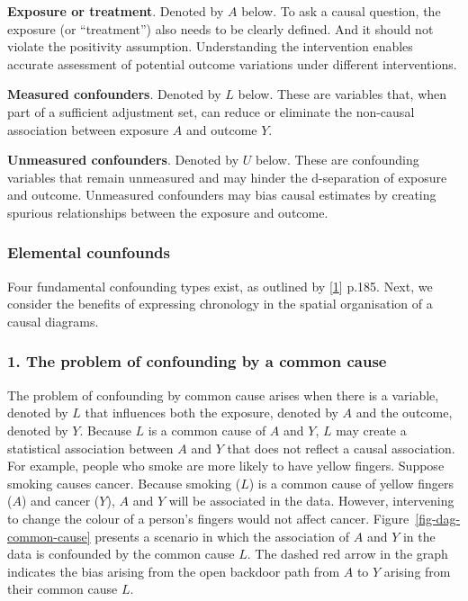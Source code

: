 \documentclass[
  singlecolumn]{article}
\begin{document}
\textbf{Exposure or treatment}. Denoted by \(A\) below. To ask a causal
question, the exposure (or ``treatment'') also needs to be clearly
defined. And it should not violate the positivity assumption.
Understanding the intervention enables accurate assessment of potential
outcome variations under different interventions.

\textbf{Measured confounders}. Denoted by \(L\) below. These are
variables that, when part of a sufficient adjustment set, can reduce or
eliminate the non-causal association between exposure \(A\) and outcome
\(Y\).

\textbf{Unmeasured confounders}. Denoted by \(U\) below. These are
confounding variables that remain unmeasured and may hinder the
d-separation of exposure and outcome. Unmeasured confounders may bias
causal estimates by creating spurious relationships between the exposure
and outcome.

\hypertarget{elemental-counfounds}{%
\subsubsection{Elemental counfounds}\label{elemental-counfounds}}

Four fundamental confounding types exist, as outlined by
{[}\protect\hyperlink{ref-mcelreath2020}{1}{]} p.185. Next, we consider
the benefits of expressing chronology in the spatial organisation of a
causal diagrams.

\hypertarget{the-problem-of-confounding-by-a-common-cause}{%
\subsubsection{1. The problem of confounding by a common
cause}\label{the-problem-of-confounding-by-a-common-cause}}

The problem of confounding by common cause arises when there is a
variable, denoted by \(L\) that influences both the exposure, denoted by
\(A\) and the outcome, denoted by \(Y.\) Because \(L\) is a common cause
of \(A\) and \(Y\), \(L\) may create a statistical association between
\(A\) and \(Y\) that does not reflect a causal association. For example,
people who smoke are more likely to have yellow fingers. Suppose smoking
causes cancer. Because smoking (\(L\)) is a common cause of yellow
fingers (\(A\)) and cancer (\(Y\)), \(A\) and \(Y\) will be associated
in the data. However, intervening to change the colour of a person's
fingers would not affect cancer. Figure~\ref{fig-dag-common-cause}
presents a scenario in which the association of \(A\) and \(Y\) in the
data is confounded by the common cause \(L\). The dashed red arrow in
the graph indicates the bias arising from the open backdoor path from
\(A\) to \(Y\) arising from their common cause \(L\).
\end{document}
